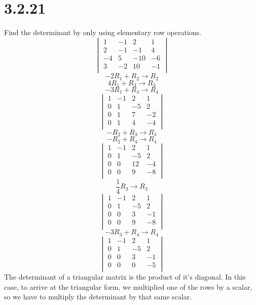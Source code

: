 \documentclass[journal]{IEEEtran}
\begin{document}
{		\section*{\Large{\textbf{3.2.21}}}
			Find  the determinant by only using elementary row operations.
			\[
				\begin{vmatrix}
					1&	-1&	2&	1 \\
					2&	-1&	-1&	4 \\
					-4&	5&	-10&	-6 \\
					3&	-2&	10&	-1 \\
				\end{vmatrix}
			\]
			\[
				-2R_1+R_2 \rightarrow R_2
			\]
			\[
				4R_1+R_3 \rightarrow R_3
			\]
			\[
				-3R_1+R_4 \rightarrow R_4
			\]
			\[
				\begin{vmatrix}
					1&	-1&	2&	1 \\
					0&	1&	-5&	2 \\
					0&	1&	7&	-2 \\
					0&	1&	4&	-4 \\
				\end{vmatrix}
			\]
			\[
				-R_2+R_3 \rightarrow R_3
			\]
			\[
				-R_2+R_4 \rightarrow R_4
			\]
			\[
				\begin{vmatrix}
					1&	-1&	2&	1 \\
					0&	1&	-5&	2 \\
					0&	0&	12&	-4 \\
					0&	0&	9&	-8 \\
				\end{vmatrix}
			\]
			\[
				\frac{1}{4}R_3 \rightarrow R_3
			\]
			\[
				\begin{vmatrix}
					1&	-1&	2&	1 \\
					0&	1&	-5&	2 \\
					0&	0&	3&	-1 \\
					0&	0&	9&	-8 \\
				\end{vmatrix}
			\]
			\[
				-3R_3 + R_4 \rightarrow R_4
			\]
			\[
				\begin{vmatrix}
					1&	-1&	2&	1 \\
					0&	1&	-5&	2 \\
					0&	0&	3&	-1 \\
					0&	0&	0&	-5 \\
				\end{vmatrix}
			\]
			The determinant of a triangular matrix is the product of it's diagonal. In this case, to arrive at the triangular form, we multiplied one of the rows by a scalar, so we have to multiply the determinant by that same scalar.

}
\end{document}
